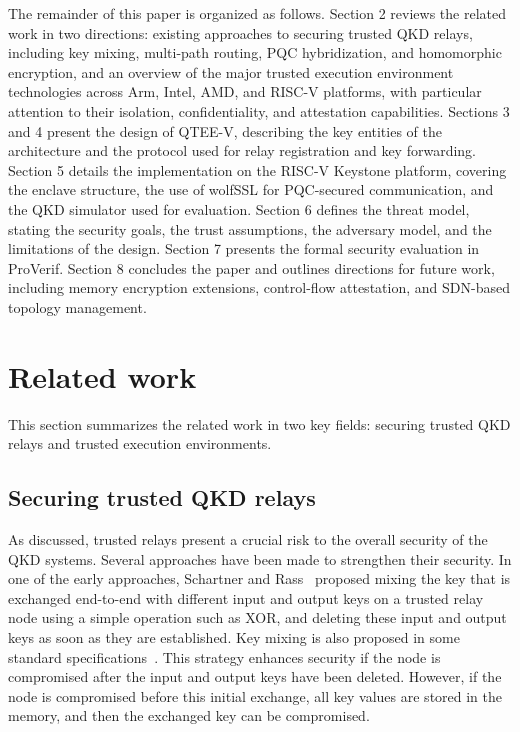 \documentclass[futureinternet,article,submit,moreauthors]{Definitions/mdpi}
\begin{document}
The remainder of this paper is organized as follows. Section 2 reviews the related work in two directions: existing approaches to securing trusted QKD relays, including key mixing, multi-path routing, PQC hybridization, and homomorphic encryption, and an overview of the major trusted execution environment technologies across Arm, Intel, AMD, and RISC-V platforms, with particular attention to their isolation, confidentiality, and attestation capabilities. Sections 3 and 4 present the design of QTEE-V, describing the key entities of the architecture and the protocol used for relay registration and key forwarding. Section 5 details the implementation on the RISC-V Keystone platform, covering the enclave structure, the use of wolfSSL for PQC-secured communication, and the QKD simulator used for evaluation. Section 6 defines the threat model, stating the security goals, the trust assumptions, the adversary model, and the limitations of the design. Section 7 presents the formal security evaluation in ProVerif. Section 8 concludes the paper and outlines directions for future work, including memory encryption extensions, control-flow attestation, and SDN-based topology management.

\section{Related work}

This section summarizes the related work in two key fields: securing trusted QKD relays and trusted execution environments.

\subsection{Securing trusted QKD relays}

As discussed, trusted relays present a crucial risk to the overall security of the QKD systems. Several approaches have been made to strengthen their security. In one of the early approaches, Schartner and Rass~\cite{schartner_how_2009} proposed mixing the key that is exchanged end-to-end with different input and output keys on a trusted relay node using a simple operation such as XOR, and deleting these input and output keys as soon as they are established. Key mixing is also proposed in some standard specifications~\cite{noauthor_quantum_2023}. This strategy enhances security if the node is compromised after the input and output keys have been deleted. However, if the node is compromised before this initial exchange, all key values are stored in the memory, and then the exchanged key can be compromised.
\end{document}
